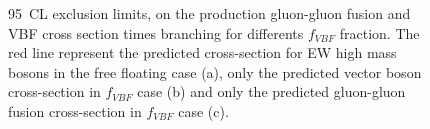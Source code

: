\begin{figure}[htb]
\centering
{}
\caption{95\ CL exclusion limits, on the production gluon-gluon fusion and VBF cross section times branching 
for differents $f_{VBF}$ fraction. The red line represent the predicted cross-section for EW high
mass bosons in the free floating case (a), only the predicted vector boson cross-section in
 $f_{VBF}$ case (b) and only the predicted gluon-gluon fusion cross-section in $f_{VBF}$ case (c).}
    \label{wwe}
\end{figure}
